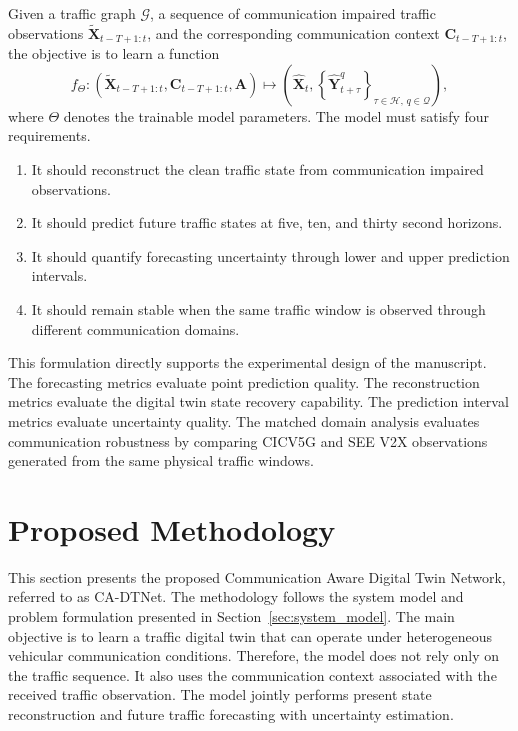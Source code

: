 \documentclass[pdflatex,sn-mathphys-num]{sn-jnl}%
\theoremstyle{thmstyleone}%
\theoremstyle{thmstyletwo}%
\theoremstyle{thmstylethree}%
\begin{document}
Given a traffic graph \(\mathcal{G}\), a sequence of communication impaired traffic observations \(\widetilde{\mathbf{X}}_{t-T+1:t}\), and the corresponding communication context \(\mathbf{C}_{t-T+1:t}\), the objective is to learn a function
\begin{equation}
    f_{\Theta}
    :
    \left(
    \widetilde{\mathbf{X}}_{t-T+1:t},
    \mathbf{C}_{t-T+1:t},
    \mathbf{A}
    \right)
    \mapsto
    \left(
    \widehat{\mathbf{X}}_{t},
    \left\{
    \widehat{\mathbf{Y}}_{t+\tau}^{q}
    \right\}_{\tau\in\mathcal{H},\,q\in\mathcal{Q}}
    \right),
\end{equation}
where \(\Theta\) denotes the trainable model parameters. The model must satisfy four requirements.

\begin{enumerate}
    \item It should reconstruct the clean traffic state from communication impaired observations.

    \item It should predict future traffic states at five, ten, and thirty second horizons.

    \item It should quantify forecasting uncertainty through lower and upper prediction intervals.

    \item It should remain stable when the same traffic window is observed through different communication domains.
\end{enumerate}

This formulation directly supports the experimental design of the manuscript. The forecasting metrics evaluate point prediction quality. The reconstruction metrics evaluate the digital twin state recovery capability. The prediction interval metrics evaluate uncertainty quality. The matched domain analysis evaluates communication robustness by comparing CICV5G and SEE V2X observations generated from the same physical traffic windows.

\section{Proposed Methodology}
\label{sec:methodology}

This section presents the proposed Communication Aware Digital Twin Network, referred to as CA-DTNet. The methodology follows the system model and problem formulation presented in Section~\ref{sec:system_model}. The main objective is to learn a traffic digital twin that can operate under heterogeneous vehicular communication conditions. Therefore, the model does not rely only on the traffic sequence. It also uses the communication context associated with the received traffic observation. The model jointly performs present state reconstruction and future traffic forecasting with uncertainty estimation.
\end{document}
